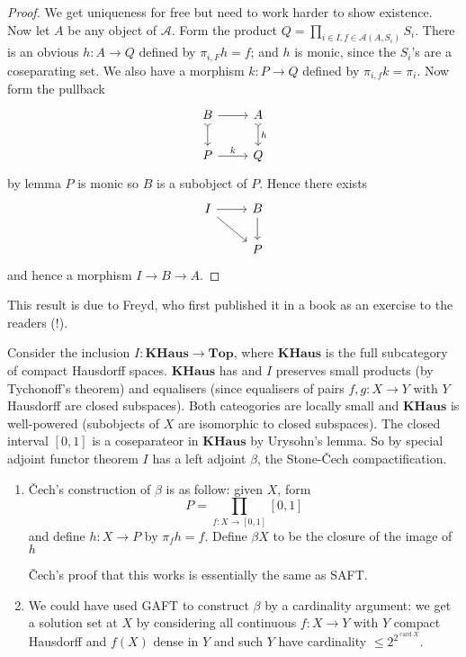 \documentclass[a4paper]{article}
\renewcommand{\c}[1]{\mathbf{#1}}
\newcommand{\Top}{{\c{Top}}}
\begin{document}
\begin{proof}
  We get uniqueness for free but need to work harder to show existence. Now let \(A\) be any object of \(\mathcal A\). Form the product \(Q = \prod_{i \in I, f \in \mathcal A (A, S_i)} S_i\). There is an obvious \(h: A \to Q\) defined by \(\pi_{i, F} h = f\); and \(h\) is monic, since the \(S_i\)'s are a coseparating set. We also have a morphism \(k: P \to Q\) defined by \(\pi_{i, f} k = \pi_i\). Now form the pullback
   \[
     \begin{tikzcd}
       B \ar[r] \ar[d, tail] & A \ar[d, "h", tail] \\
       P \ar[r, "k"] & Q
     \end{tikzcd}
   \]
  by lemma \(P\) is monic so \(B\) is a subobject of \(P\). Hence there exists
  \[
    \begin{tikzcd}
      I \ar[r] \ar[dr] & B \ar[d] \\
      & P
    \end{tikzcd}
  \]
  and hence a morphism \(I \to B \to A\).
\end{proof}

This result is due to Freyd, who first published it in a book as an exercise to the readers (!).

\begin{eg}
  Consider the inclusion \(I: \c{KHaus} \to \Top\), where \(\c{KHaus}\) is the full subcategory of compact Hausdorff spaces. \(\c{KHaus}\) has and \(I\) preserves small products (by Tychonoff's theorem) and equalisers (since equalisers of pairs \(f, g: X \to Y\) with \(Y\) Hausdorff are closed subspaces). Both cateogories are locally small and \(\c{KHaus}\) is well-powered (subobjects of \(X\) are isomorphic to closed subspaces). The closed interval \([0, 1]\) is a coseparateor in \(\c{KHaus}\) by Urysohn's lemma. So by special adjoint functor theorem \(I\) has a left adjoint \(\beta\), the Stone-Čech compactification.
\end{eg}

\begin{remark}\leavevmode
  \begin{enumerate}
  \item %

  Čech's construction of \(\beta\) is as follow: given \(X\), form
  \[
    P = \prod_{f: X \to [0, 1]} [0, 1]
  \]
  and define \(h: X \to P\) by \(\pi_f h = f\). Define \(\beta X\) to be the closure of the image of \(h\)


  Čech's proof that this works is essentially the same as SAFT.
\item We could have used GAFT to construct \(\beta\) by a cardinality argument: we get a solution set at \(X\) by considering all continuous \(f: X \to Y\) with \(Y\) compact Hausdorff and \(f(X)\) dense in \(Y\) and such \(Y\) have cardinality \(\leq 2^{2^{\operatorname{card} X}}\).
  \end{enumerate}
\end{remark}
\end{document}
